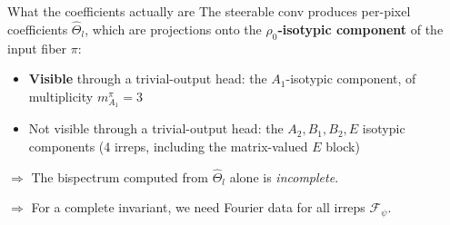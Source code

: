 \documentclass[aspectratio=169]{beamer}
\newcommand{\FF}{\mathcal{F}}
\begin{document}
\begin{frame}{What the coefficients actually are}
  The steerable conv produces per-pixel coefficients $\hat{\Theta}_l$, which are projections onto the $\rho_0$\textbf{-isotypic component} of the input fiber $\pi$:

  \begin{itemize}
    \item \textbf{Visible} through a trivial-output head: the $A_1$-isotypic component, of multiplicity $m^{\pi}_{A_1} = 3$
    \item \alert{Not visible} through a trivial-output head: the $A_2, B_1, B_2, E$ isotypic components (4 irreps, including the matrix-valued $E$ block)
  \end{itemize}

  \bigskip

  $\Rightarrow$ The bispectrum computed from $\hat{\Theta}_l$ alone is \textit{incomplete}.

  \medskip

  $\Rightarrow$ For a complete invariant, we need Fourier data for \alert{all} irreps $\FF_\psi$.
\end{frame}
\end{document}
